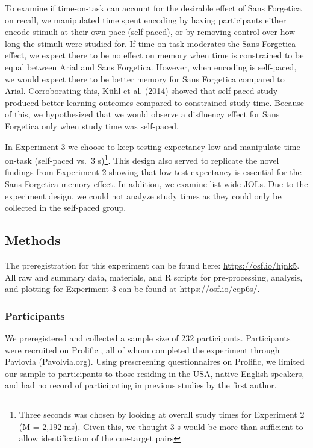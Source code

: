 \documentclass[
  english,
  jou]{apa7}
\begin{document}
To examine if time-on-task can account for the desirable effect of Sans Forgetica on recall, we manipulated time spent encoding by having participants either encode stimuli at their own pace (self-paced), or by removing control over how long the stimuli were studied for. If time-on-task moderates the Sans Forgetica effect, we expect there to be no effect on memory when time is constrained to be equal between Arial and Sans Forgetica. However, when encoding is self-paced, we would expect there to be better memory for Sans Forgetica compared to Arial. Corroborating this, Kühl et al. (2014) showed that self-paced study produced better learning outcomes compared to constrained study time. Because of this, we hypothesized that we would observe a disfluency effect for Sans Forgetica only when study time was self-paced.

In Experiment 3 we choose to keep testing expectancy low and manipulate time-on-task (self-paced vs.~3 s)\footnote{Three seconds was chosen by looking at overall study times for Experiment 2 (M = 2,192 ms). Given this, we thought 3 s would be more than sufficient to allow identification of the cue-target pairs}. This design also served to replicate the novel findings from Experiment 2 showing that low test expectancy is essential for the Sans Forgetica memory effect. In addition, we examine list-wide JOLs. Due to the experiment design, we could not analyze study times as they could only be collected in the self-paced group.

\hypertarget{methods-1}{%
\subsection{Methods}\label{methods-1}}

The preregistration for this experiment can be found here: \url{https://osf.io/hjnk5}. All raw and summary data, materials, and R scripts for pre-processing, analysis, and plotting for Experiment 3 can be found at \url{https://osf.io/cqp6s/}.

\hypertarget{participants-2}{%
\subsubsection{Participants}\label{participants-2}}

We preregistered and collected a sample size of 232 participants. Participants were recruited on Prolific , all of whom completed the experiment through Pavlovia (Pavolvia.org). Using prescreening questionnaires on Prolific, we limited our sample to participants to those residing in the USA, native English speakers, and had no record of participating in previous studies by the first author.
\end{document}
